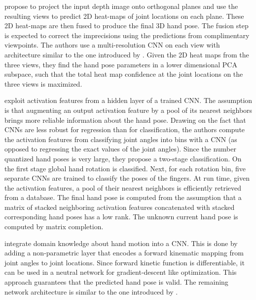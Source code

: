 \hspace{-0.4em}
\textbf{\cite{ge2016robust}} 
propose to project the input depth image onto orthogonal planes and use the resulting views to predict 2D heat-maps of joint locations on each plane. These 2D heat-maps are then fused to produce the final 3D hand pose. The fusion step is expected to correct the imprecisions using the predictions from complimentary viewpoints. The authors use a multi-resolution CNN on each view with architecture similar to the one introduced by \cite{tompson2014real}. Given the 2D heat maps from the three views, they find the hand pose parameters in a lower dimensional PCA subspace, such that the total heat map confidence at the joint locations on the three views is maximized. 

\hspace{-0.4em}
\textbf{\cite{sinha2016deephand}} 
exploit activation features from a hidden layer of a trained CNN. The assumption is that augmenting an output activation feature by a pool of its nearest neighbors brings more reliable information about the hand pose. Drawing on the fact that CNNs are less robust for regression than for classification, the authors compute the activation features from classifying joint angles into bins with a CNN (as opposed to regressing the exact values of the joint angles). Since the number quantized hand poses is very large, they propose a  two-stage classification. On the first stage global hand rotation is classified. Next, for each rotation bin, five separate CNNs are trained to classify the poses of the fingers. At run time, given the activation features, a pool of their nearest neighbors is efficiently retrieved from a database. The final hand pose is computed from the assumption that a matrix of stacked neighboring activation features concatenated with stacked corresponding hand poses has a low rank. The unknown current hand pose is computed by matrix completion.

\hspace{-0.4em}
\textbf{\cite{zhou2016model}} 
integrate domain knowledge about hand motion into a CNN. This is done by adding a non-parametric layer that encodes a forward kinematic mapping from joint angles to joint locations. Since forward kinetic function is differentiable, it can be used in a neutral network for gradient-descent like optimization. This approach guarantees that the predicted hand pose is valid. The remaining network architecture is similar to the one introduced by \cite{oberweger2015hands}.

